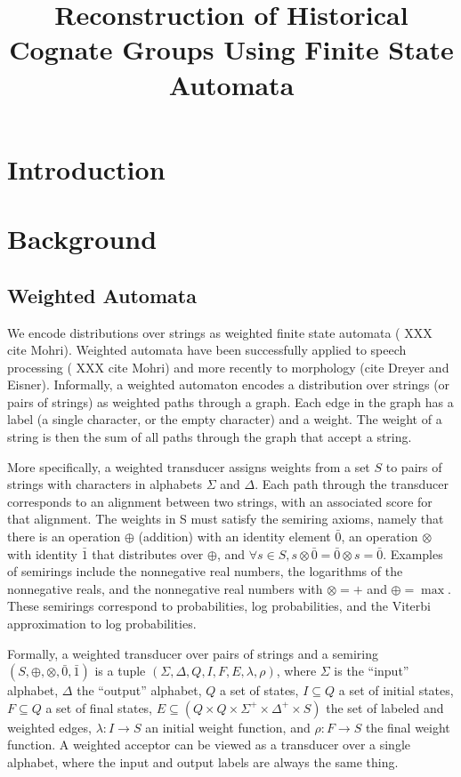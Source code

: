 \documentclass[11pt,a4paper]{article}
\title{Reconstruction of Historical Cognate Groups Using Finite State Automata}
\author{}
\date{}
\begin{document}
\maketitle
\begin{abstract}
\end{abstract}
\section{Introduction}
\section{Background}
\subsection{Weighted Automata}

We encode distributions over strings as weighted finite state
automata ( XXX cite Mohri). Weighted automata have been successfully
applied to speech processing ( XXX cite Mohri) and more recently
to morphology (cite Dreyer and Eisner). Informally, a weighted
automaton encodes a distribution over strings (or pairs of strings)
as weighted paths through a graph. Each edge in the graph has a
label (a single character, or the empty character) and a weight.
The weight of a string is then the sum of all paths through the
graph that accept a string.

More specifically, a weighted transducer assigns weights from a set
$S$ to pairs of strings with characters in alphabets $\Sigma$ and
$\Delta$. Each path through the transducer corresponds to an alignment
between two strings, with an associated score for that alignment.
The weights in S must satisfy the semiring axioms, namely that there
is an operation $\oplus$ (addition) with an identity element $\bar
0$, an operation $\otimes$ with identity $\bar 1$ that distributes
over $\oplus$, and $\forall s\in S, s\otimes \bar 0 = \bar 0 \otimes
s = \bar 0$. Examples of semirings include the nonnegative real
numbers, the logarithms of the nonnegative reals, and the nonnegative
real numbers with $\otimes = +$ and $\oplus = \max$. These semirings
correspond to probabilities, log probabilities, and the Viterbi
approximation to log probabilities.

Formally, a weighted transducer over pairs of strings and a semiring
$(S,\oplus,\otimes,\bar 0, \bar 1)$ is a tuple
$(\Sigma,\Delta,Q,I,F,E,\lambda,\rho)$, where $\Sigma$ is the
``input'' alphabet, $\Delta$ the ``output'' alphabet, $Q$ a set of
states, $I \subseteq Q$ a set of initial states, $F \subseteq Q$ a
set of final states, $E \subseteq (Q \times Q \times \Sigma^+ \times
\Delta^+ \times S)$ the set of labeled and weighted edges, $\lambda:
I \rightarrow S$ an initial weight function, and $\rho: F \rightarrow
S$ the final weight function. A weighted acceptor can be viewed as
a transducer over a single alphabet, where the input and output
labels are always the same thing.
\end{document}

